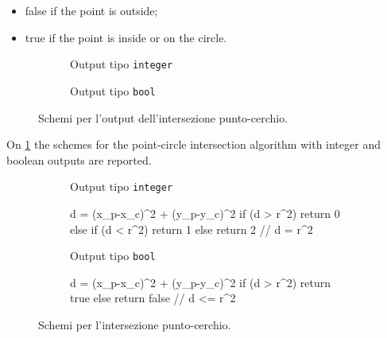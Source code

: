 \begin{itemize}
	\item false if the point is outside;
	\item true if the point is inside or on the circle.
\end{itemize}
%
\begin{figure}
\hfill
	\begin{subfigure}{.45\textwidth}
	\centering
	\caption{Output tipo \texttt{integer}}
	\end{subfigure}
\hfill
\begin{subfigure}{.45\textwidth}
	\centering
	\caption{Output tipo \texttt{bool}}
\end{subfigure}
\hfill
\caption{Schemi per l'output dell'intersezione punto-cerchio.}
\end{figure}
On \figurename{ \ref{Pointcircle}} the schemes for the point-circle intersection algorithm with integer and boolean outputs are reported.\\
%
\begin{figure}[htbp]
\hfill
	\begin{subfigure}[t]{.45\linewidth}
	\raggedright
	Output tipo \texttt{integer}\\
	\vspace{.5em}
	\begin{pseudoc}
	d = (x_p-x_c)^2 + (y_p-y_c)^2
	if (d > r^2) { return  0}
	else if (d < r^2) { return 1 }
	else { return 2} // d = r^2
	\end{pseudoc}
	\end{subfigure}
\hfill
	\begin{subfigure}[t]{.45\textwidth}
	\raggedright
	Output tipo \texttt{bool}\\
	\vspace{.5em}
	\begin{pseudoc}
	d = (x_p-x_c)^2 + (y_p-y_c)^2
	if (d > r^2) { return  true}
	else { return false} // d <= r^2
	\end{pseudoc}	
	\end{subfigure}
\hfill
\caption{Schemi per l'intersezione punto-cerchio.}
\label{Pointcircle}
\end{figure}
%
